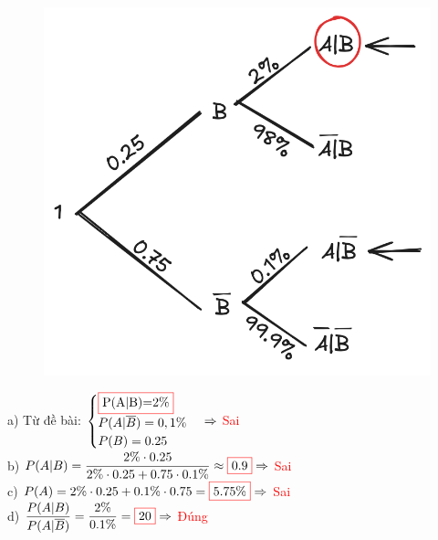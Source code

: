 \documentclass[twoside,final]{hcmut-report}
\newcommand{\result}[1]{\fcolorbox{red}{white}{#1}}
\begin{document}
\begin{minipage}{0.35\textwidth}
    \begin{figure}[H]
        \includegraphics[width=\textwidth]{images/Nghệ An 2025 - Đợt 3/NgheAn25-1.png}
    \end{figure}
\end{minipage}
\begin{minipage}{0.65\textwidth}
    a) Từ đề bài: $\begin{cases}
            \result{P(A|B)=2\%}       \\
            P(A|\overline{B}) = 0,1\% \\
            P(B) = 0.25
        \end{cases} \Rightarrow$ \textcolor{red}{Sai}\\

    b) $P(A|B) = \dfrac{2\%\cdot 0.25}{2\%\cdot 0.25 + 0.75\cdot 0.1\%} \approx \result{0.9} \Rightarrow$ \textcolor{red}{Sai}\\

    c) $P(A) = 2\%\cdot 0.25 + 0.1\%\cdot 0.75 = \result{5.75\%} \Rightarrow$ \textcolor{red}{Sai}\\

    d) $\dfrac{P(A|B)}{P(A|\overline{B})} = \dfrac{2\%}{0.1\%} = \result{20}\Rightarrow$  \textcolor{red}{Đúng}
\end{minipage}
\end{document}
